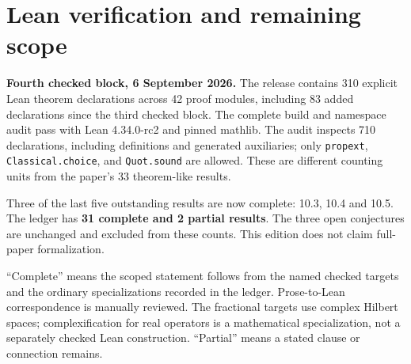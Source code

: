 \clearpage
\appendix
\section{Lean verification and remaining scope}\label{sec:lean-status}
\noindent\textbf{Fourth checked block, 6 September 2026.}
The release contains 310 explicit Lean theorem declarations across 42 proof modules,
including 83 added declarations since the third checked block. The complete
build and namespace audit pass with Lean 4.34.0-rc2 and pinned mathlib.
The audit inspects 710 declarations, including definitions and generated auxiliaries;
only \texttt{propext}, \texttt{Classical.choice}, and \texttt{Quot.sound} are allowed.
These are different counting units from the paper's 33 theorem-like results.

Three of the last five outstanding results are now complete: 10.3, 10.4 and 10.5.
The ledger has \textbf{31 complete and 2 partial results}.
The three open conjectures are unchanged and excluded from these counts.
This edition does not claim full-paper formalization.

``Complete'' means the scoped statement follows from the named checked targets
and the ordinary specializations recorded in the ledger. Prose-to-Lean correspondence
is manually reviewed. The fractional targets use complex Hilbert spaces;
complexification for real operators is a mathematical specialization, not a separately
checked Lean construction. ``Partial'' means a stated clause or connection remains.

